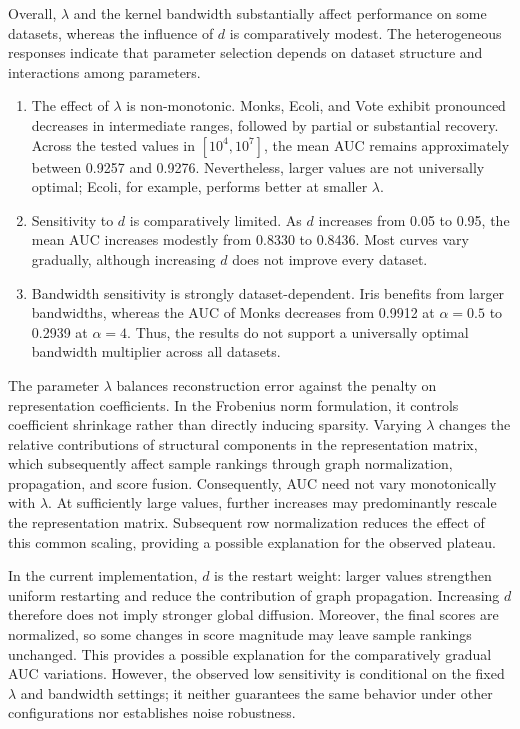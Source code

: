 \documentclass[ASNA,twocolumn]{USG} %
\begin{document}
Overall, $\lambda$ and the kernel bandwidth substantially affect performance on some datasets, whereas the influence of $d$ is comparatively modest. The heterogeneous responses indicate that parameter selection depends on dataset structure and interactions among parameters.

\begin{enumerate}[\indent (1)]
    \item The effect of $\lambda$ is non-monotonic.
    Monks, Ecoli, and Vote exhibit pronounced decreases
    in intermediate ranges, followed by partial or substantial recovery. Across the tested values in $[10^4,10^7]$, the mean AUC remains approximately between 0.9257 and 0.9276. Nevertheless, larger values are not universally optimal; Ecoli, for example, performs better at smaller $\lambda$.

    \item Sensitivity to $d$ is comparatively limited.
    As $d$ increases from 0.05 to 0.95, the mean AUC
    increases modestly from 0.8330 to 0.8436.
    Most curves vary gradually, although increasing $d$
    does not improve every dataset.

    \item Bandwidth sensitivity is strongly dataset-dependent.
    Iris benefits from larger bandwidths, whereas the AUC
    of Monks decreases from 0.9912 at $\alpha=0.5$
    to 0.2939 at $\alpha=4$. Thus, the results do not
    support a universally optimal bandwidth multiplier
    across all datasets.
\end{enumerate}

The parameter $\lambda$ balances reconstruction error against the penalty on representation coefficients. In the Frobenius norm formulation, it controls coefficient shrinkage rather than directly inducing sparsity. Varying $\lambda$ changes the relative contributions of structural components in the representation matrix, which subsequently affect sample rankings through graph normalization, propagation, and score fusion. Consequently,
AUC need not vary monotonically with $\lambda$. At sufficiently large values, further increases may predominantly rescale the representation matrix. Subsequent row normalization reduces the effect of this common scaling, providing a possible explanation for the observed plateau.

In the current implementation, $d$ is the restart weight:
larger values strengthen uniform restarting and reduce the
contribution of graph propagation. Increasing $d$ therefore
does not imply stronger global diffusion. Moreover, the final scores are normalized, so some changes in score magnitude may leave sample rankings unchanged. This provides a possible explanation for the comparatively gradual AUC variations.
However, the observed low sensitivity is conditional on the
fixed $\lambda$ and bandwidth settings; it neither guarantees the same behavior under other configurations nor establishes noise robustness.
\end{document}
